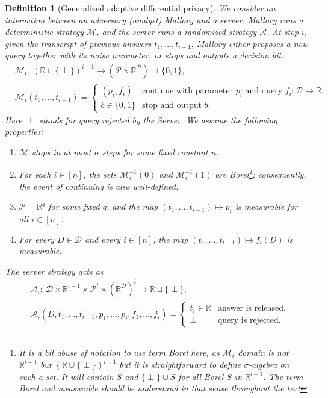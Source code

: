 \documentclass[12pt,letterpaper]{article}
\newcommand{\R}{\mathbb{R}}
\newtheorem{definition}{Definition}
\begin{document}
\begin{definition}[Generalized adaptive differential privacy]
  \label{def:generalized_adapt}
We consider an interaction between an adversary (analyst) Mallory and a server. Mallory runs a deterministic strategy $\mathcal{M}$, and the server runs a randomized strategy $\mathcal{A}$. At step $i$, given the transcript of previous answers $t_1,\ldots,t_{i-1}$, Mallory either proposes a new query together with its noise parameter, or stops and outputs a decision bit:
\begin{align*}
&\mathcal{M}_i:\ (\R \sqcup \{\perp\})^{i-1} \to (\mathcal{P} \times \R^{\mathcal{D}})\,\sqcup\,\{0,1\},\\
&\mathcal{M}_i(t_1,\ldots,t_{i-1}) = \begin{cases}
  (p_i, f_i) & \text{continue with parameter }p_i\text{ and query }f_i: \mathcal{D}\to\R,\\
  b\in\{0,1\} & \text{stop and output }b.
\end{cases}
\end{align*}
Here $\perp$ stands for query rejected by the Server. We assume the following properties:
\begin{enumerate}
  \item $\mathcal{M}$ stops in at most $n$ steps for some fixed constant $n$.
  \item For each $i\in [n]$, the sets $\mathcal{M}_i^{-1}(0)$ and $\mathcal{M}_i^{-1}(1)$ are Borel\footnote{It is a bit abuse of notation to use term Borel here, as $\mathcal{M}_i$ domain is not $\R^{i-1}$ but $(\R \cup \{\perp\})^{i - 1}$ but it is straightforward to define $\sigma$-algebra on such a set. It will contain $S$ and $\{\perp\} \cup S$ for all Borel $S$ in $\R^{i-1}$. The term Borel and measurable should be understand in that sense throughout the text}; consequently, the event of continuing is also well-defined.
  \item $\mathcal{P} = \R^q$ for some fixed $q$, and the map $(t_1,\ldots,t_{i-1}) \mapsto p_i$ is measurable for all $i\in[n]$.
  \item For every $D\in\mathcal{D}$ and every $i\in[n]$, the map $(t_1,\ldots,t_{i-1}) \mapsto f_i(D)$ is measurable.
\end{enumerate}
The server strategy acts as
\begin{align*}
&\mathcal{A}_i:\ \mathcal{D} \times \R^{i-1} \times \mathcal{P}^{i} \times (\R^{\mathcal{D}})^i \to \R \sqcup \{\perp\},\\
&\mathcal{A}_i(D, t_1,\ldots,t_{i-1}, p_1, \ldots, p_i, f_1, \ldots, f_i) = \begin{cases}
  t_i \in \R & \text{answer is released},\\
  \perp & \text{query is rejected}.
\end{cases}
\end{align*}


\end{definition}
\end{document}
